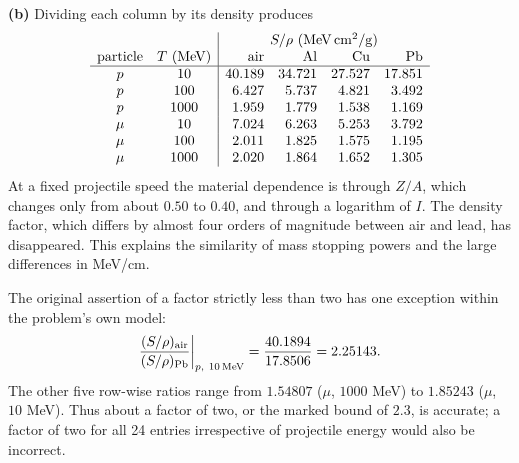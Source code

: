 \textbf{(b)} Dividing each column by its density produces
\[
\begin{array}{cc|rrrr}
 &&\multicolumn{4}{c}{S/\rho\ ({\rm MeV\,cm^2/g})}\\
 \text{particle}&T\ ({\rm MeV})&\text{air}&\text{Al}&\text{Cu}&\text{Pb}\\ \hline
 p&10&40.189&34.721&27.527&17.851\\
 p&100&6.427&5.737&4.821&3.492\\
 p&1000&1.959&1.779&1.538&1.169\\
 \mu&10&7.024&6.263&5.253&3.792\\
 \mu&100&2.011&1.825&1.575&1.195\\
 \mu&1000&2.020&1.864&1.652&1.305
\end{array}
\]
At a fixed projectile speed the material dependence is through $Z/A$,
which changes only from about $0.50$ to $0.40$, and through a logarithm
of $I$. The density factor, which differs by almost four orders of
magnitude between air and lead, has disappeared. This explains the
similarity of mass stopping powers and the large differences in MeV/cm.

The original assertion of a factor strictly less than two has one
exception within the problem's own model:
\[
 \frac{(S/\rho)_{\rm air}}{(S/\rho)_{\rm Pb}}
 \bigg|_{p,\ 10\,{\rm MeV}}
 =\frac{40.1894}{17.8506}=2.25143.
\]
The other five row-wise ratios range from $1.54807$ ($\mu$, $1000$ MeV)
to $1.85243$ ($\mu$, $10$ MeV).
Thus about a factor of two, or the marked bound of $2.3$, is accurate;
a factor of two for all 24 entries irrespective of projectile energy
would also be incorrect.







